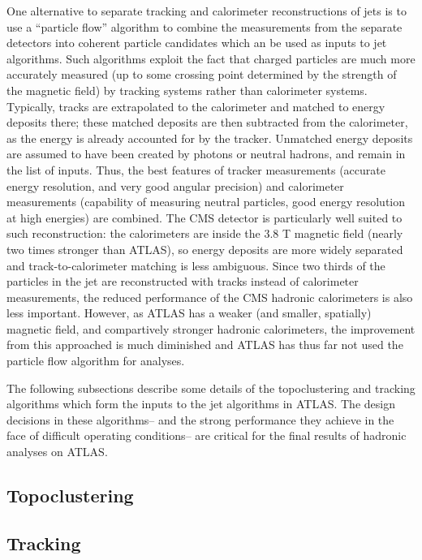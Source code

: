 One alternative to separate tracking and calorimeter reconstructions of jets is to use a ``particle flow'' algorithm to combine the measurements from the separate detectors into coherent particle candidates which an be used as inputs to jet algorithms. Such algorithms exploit the fact that charged particles are much more accurately measured (up to some crossing point determined by the strength of the magnetic field) by tracking systems rather than calorimeter systems. Typically, tracks are extrapolated to the calorimeter and matched to energy deposits there; these matched deposits are then subtracted from the calorimeter, as the energy is already accounted for by the tracker. Unmatched energy deposits are assumed to have been created by photons or neutral hadrons, and remain in the list of inputs. Thus, the best features of tracker measurements (accurate energy resolution, and very good angular precision) and calorimeter measurements (capability of measuring neutral particles, good energy resolution at high energies) are combined. The CMS detector is particularly well suited to such reconstruction: the calorimeters are inside the 3.8 T magnetic field (nearly two times stronger than ATLAS), so energy deposits are more widely separated and track-to-calorimeter matching is less ambiguous. Since two thirds of the particles in the jet are reconstructed with tracks instead of calorimeter measurements, the reduced performance of the CMS hadronic calorimeters is also less important. However, as ATLAS has a weaker (and smaller, spatially) magnetic field, and compartively stronger hadronic calorimeters, the improvement from this approached is much diminished and ATLAS has thus far not used the particle flow algorithm for analyses. 

The following subsections describe some details of the topoclustering and tracking algorithms which form the inputs to the jet algorithms in ATLAS. The design decisions in these algorithms-- and the strong performance they achieve in the face of difficult operating conditions-- are critical for the final results of hadronic analyses on ATLAS.

\subsection{Topoclustering}
\label{jet-reconstruction:jet-inputs:topoclustering}

\subsection{Tracking}

